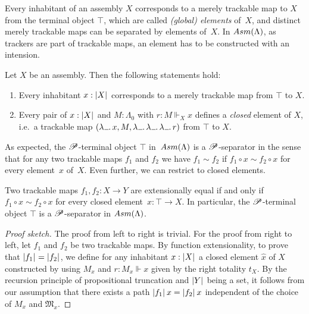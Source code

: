 \documentclass[a4paper,UKenglish,numberwithinsect,cleveref,thm-restate]{lipics-v2021}
\numberwithin{equation}{section}
\theoremstyle{definition}
\theoremstyle{plain}
\begin{document}
Every inhabitant of an assembly $X$ corresponds to a merely trackable map to $X$ from the terminal object $\top$, which are called \emph{(global) elements} of~$X$, and distinct merely trackable maps can be separated by elements of~$X$.
In $\Asm(\Lambda)$, as trackers are part of trackable maps, an element has to be constructed with an intension.
\begin{lemma}\label{lem:global-element}
  Let $X$ be an assembly. Then the following statements hold:
  \begin{enumerate}
    \item Every inhabitant $x : \mathopen{}\left|X\right|_{}^{}\mathclose{}$ corresponds to a merely trackable map from $\top$ to $X$.
    \item Every pair of $x : \mathopen{}\left|X\right|_{}^{}\mathclose{}$ and $M : \Lambda_0$ with $r : M \Vdash_X x$ defines a \emph{closed} element of $X$, i.e.\ a trackable map $(\lambda\anonymous.\, x, M, \lambda\anonymous.\,\lambda\anonymous.\, \lambda\anonymous.\, r)$ from $\top$ to $X$.
  \end{enumerate}
\end{lemma}

As expected, the $\mathscr{P}$-terminal object $\top$ in~$\Asm(\Lambda)$ is a $\mathscr{P}$-separator in the sense that for any two trackable maps $f_1$ and $f_2$ we have $f_1 \sim f_2$ if $f_1 \circ x \sim f_2 \circ x$ for every element~$x$ of~$X$.
Even further, we can restrict to closed elements.
\begin{proposition}
  Two trackable maps $f_1, f_2\colon X \to Y$ are extensionally equal if and only if $f_1 \circ x \sim f_2 \circ x$ for every closed element~$x\colon \top \to X$.
  In particular, the $\mathscr{P}$-terminal object $\top$ is a $\mathscr{P}$-separator in $\Asm(\Lambda)$.
\end{proposition}
\begin{proof}[Proof sketch]
  The proof from left to right is trivial.
  For the proof from right to left, let $f_1$ and $f_2$ be two trackable maps.
  By function extensionality, to prove that $\mathopen{}\left|f_1\right|_{}^{}\mathclose{} = \mathopen{}\left|f_2\right|_{}^{}\mathclose{}$, we define for any inhabitant $x : \mathopen{}\left|X\right|_{}^{}\mathclose{}$ a closed element $\hat{x}$ of $X$ constructed by  using $M_x$ and $r : M_x \Vdash x$ given by the right totality $t_X$.
  By the recursion principle of propositional truncation and $\mathopen{}\left|Y\right|_{}^{}\mathclose{}$ being a set, it follows from our assumption that there exists a path $\mathopen{}\left|f_1\right|_{}^{}\mathclose{}\,x = \mathopen{}\left|f_2\right|_{}^{}\mathclose{}\, x$ independent of the choice of $M_x$ and $\mathfrak{M}_x$.
\end{proof}
\end{document}
